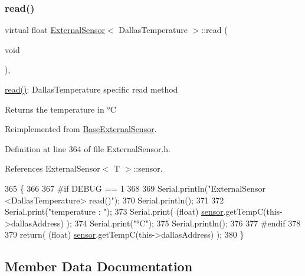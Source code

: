 \subsubsection{\texorpdfstring{read()}{read()}}
{\footnotesize\ttfamily virtual float \hyperlink{classExternalSensor}{External\+Sensor}$<$ Dallas\+Temperature $>$\+::read (\begin{DoxyParamCaption}\item[{void}]{ }\end{DoxyParamCaption})\hspace{0.3cm}{\ttfamily [inline]}, {\ttfamily [virtual]}}

\hyperlink{classExternalSensor_3_01DallasTemperature_01_4_a1e725d9338314515d4e5dc456ed6a6c8}{read()}\+: Dallas\+Temperature specific read method

\begin{DoxyReturn}{Returns}
the temperature in °C 
\end{DoxyReturn}


Reimplemented from \hyperlink{classBaseExternalSensor_a1564f16deacf57b51b9948ac29db4291}{Base\+External\+Sensor}.



Definition at line 364 of file External\+Sensor.\+h.



References External\+Sensor$<$ T $>$\+::sensor.


\begin{DoxyCode}
365     \{
366     
367 \textcolor{preprocessor}{    #if DEBUG == 1 }
368 
369         Serial.println(\textcolor{stringliteral}{"ExternalSensor <DallasTemperature> read()"});
370         Serial.println();
371 
372         Serial.print(\textcolor{stringliteral}{"temperature : "});
373         Serial.print( (\textcolor{keywordtype}{float}) \hyperlink{classExternalSensor_3_01DallasTemperature_01_4_adb6ba4fcdedef95ad8f6b0c9b6c0f9d1}{sensor}.getTempC(this->dallasAddress) );
374         Serial.print(\textcolor{stringliteral}{"°C"});
375         Serial.println();
376     
377 \textcolor{preprocessor}{    #endif}
378         
379         \textcolor{keywordflow}{return}( (\textcolor{keywordtype}{float}) \hyperlink{classExternalSensor_3_01DallasTemperature_01_4_adb6ba4fcdedef95ad8f6b0c9b6c0f9d1}{sensor}.getTempC(this->dallasAddress) );
380     \}
\end{DoxyCode}


\subsection{Member Data Documentation}
\mbox{\label{classExternalSensor_3_01DallasTemperature_01_4_a7d9e9d2893e453638fcf440e5d8d9082}} 
